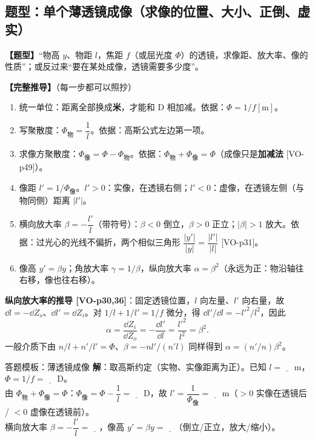 \subsection{题型：单个薄透镜成像（求像的位置、大小、正倒、虚实）}\label{sec:lensimg}
\textbf{【题型】}“物高 $y$、物距 $l$，焦距 $f$（或屈光度 $\Phi$）的透镜，求像距、放大率、像的性质”；或反过来“要在某处成像，透镜需要多少度”。

\textbf{【完整推导】}（每一步都可以照抄）
\begin{enumerate}
\item 统一单位：距离全部换成\textbf{米}，才能和 D 相加减。依据：$\Phi=1/f[\text{m}]$。
\item 写聚散度：$\Phi_{\text{物}}=\dfrac1l$。依据：高斯公式左边第一项。
\item 求像方聚散度：$\Phi_{\text{像}}=\Phi-\Phi_{\text{物}}$。依据：$\Phi_{\text{物}}+\Phi_{\text{像}}=\Phi$（成像只是\textbf{加减法} [VO-p49]）。
\item 像距 $l'=1/\Phi_{\text{像}}$。$l'>0$：实像，在透镜右侧；$l'<0$：虚像，在透镜左侧（与物同侧）距离 $|l'|$。
\item 横向放大率 $\beta=-\dfrac{l'}{l}$（带符号）：$\beta<0$ 倒立，$\beta>0$ 正立；$|\beta|>1$ 放大。依据：过光心的光线不偏折，两个相似三角形 $\dfrac{|y'|}{|y|}=\dfrac{|l'|}{|l|}$ [VO-p31]。
\item 像高 $y'=\beta y$；角放大率 $\gamma=1/\beta$，纵向放大率 $\alpha=\beta^2$（永远为正：物沿轴往右移，像也往右移）。
\end{enumerate}

\textbf{纵向放大率的推导 [VO-p30,36]}：固定透镜位置，$l$ 向左量、$l'$ 向右量，故 $\dd l=-\dd Z_o$、$\dd l'=\dd Z_i$。对 $1/l+1/l'=1/f$ 微分，得 $\dd l'/\dd l=-l'^2/l^2$，因此
\[
\alpha=\frac{\dd Z_i}{\dd Z_o}=-\frac{\dd l'}{\dd l}=\frac{l'^2}{l^2}=\beta^2.
\]
一般介质下由 $n/l+n'/l'=\Phi$、$\beta=-nl'/(n'l)$ 同样得到 $\alpha=(n'/n)\beta^2$。

\begin{exam}{答题模板：薄透镜成像}
\textbf{解}：取高斯约定（实物、实像距离为正）。已知 $l=\underline{\quad}$ m，$\Phi=1/f=\underline{\quad}$ D。\\
由 $\Phi_{\text{物}}+\Phi_{\text{像}}=\Phi$：$\Phi_{\text{像}}=\Phi-\dfrac1l=\underline{\quad}$ D，故 $l'=\dfrac1{\Phi_{\text{像}}}=\underline{\quad}$ m（$>0$ 实像在透镜后 / $<0$ 虚像在透镜前）。\\
横向放大率 $\beta=-\dfrac{l'}{l}=\underline{\quad}$，像高 $y'=\beta y=\underline{\quad}$（倒立/正立，放大/缩小）。
\end{exam}


